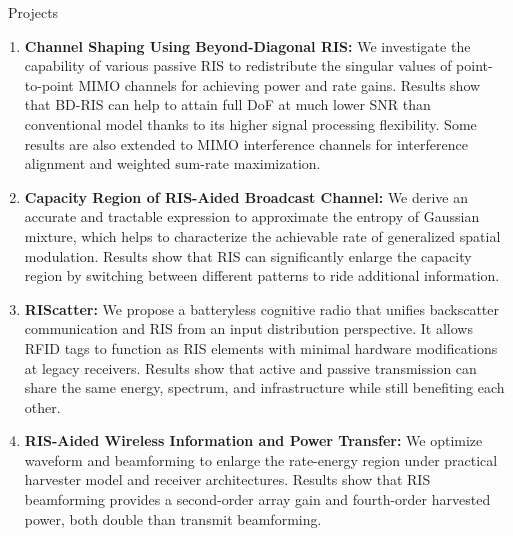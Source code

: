 \documentclass{cv}
\begin{document}
\begin{section}{\faPaperPlane\ Projects}
	\begin{enumerate}
		\item \textbf{Channel Shaping Using Beyond-Diagonal RIS:} We investigate the capability of various passive RIS to redistribute the singular values of point-to-point MIMO channels for achieving power and rate gains. Results show that BD-RIS can help to attain full DoF at much lower SNR than conventional model thanks to its higher signal processing flexibility. Some results are also extended to MIMO interference channels for interference alignment and weighted sum-rate maximization.
		\item \textbf{Capacity Region of RIS-Aided Broadcast Channel:} We derive an accurate and tractable expression to approximate the entropy of Gaussian mixture, which helps to characterize the achievable rate of generalized spatial modulation. Results show that RIS can significantly enlarge the capacity region by switching between different patterns to ride additional information.
		\item \textbf{RIScatter:} We propose a batteryless cognitive radio that unifies backscatter communication and RIS from an input distribution perspective. It allows RFID tags to function as RIS elements with minimal hardware modifications at legacy receivers. Results show that active and passive transmission can share the same energy, spectrum, and infrastructure while still benefiting each other.
		\item \textbf{RIS-Aided Wireless Information and Power Transfer:} We optimize waveform and beamforming to enlarge the rate-energy region under practical harvester model and receiver architectures. Results show that RIS beamforming provides a second-order array gain and fourth-order harvested power, both double than transmit beamforming.
	\end{enumerate}
\end{section}

\vspace{-1.5em}
\end{document}
